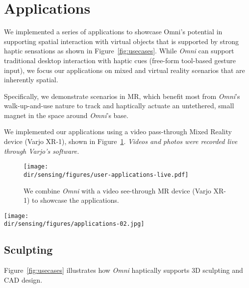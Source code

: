 \section{Applications}
We implemented a series of applications to showcase Omni's potential in supporting spatial interaction with virtual objects that is supported by strong haptic sensations as shown in Figure~\ref{fig:usecases}. While \textit{Omni} can support traditional desktop interaction with haptic cues (\eg free-form tool-based gesture input), we focus our applications on mixed and virtual reality scenarios that are inherently spatial.

Specifically, we demonstrate scenarios in MR, which benefit most from \textit{Omni}'s walk-up-and-use nature to track and haptically actuate an untethered, small magnet in the space around \textit{Omni}'s base.

We implemented our applications using a video pass-through Mixed Reality device (Varjo XR-1), shown in Figure~\ref{fig:photo_device_ar}.
\textit{Videos and photos were recorded live through Varjo's software.}
\begin{figure}[!t]
\centering
\texttt{[image: \\dir/sensing/figures/user-applications-live.pdf]}
\caption{We combine \textit{Omni} with a video see-through MR device (Varjo XR-1) to showcase the applications.}
\label{fig:photo_device_ar}
\end{figure}

\begin{figure*}[!t]
\centering
\texttt{[image: \\dir/sensing/figures/applications-02.jpg]}
\caption{We present possible use cases for \textit{Omni}. \textit{Left} shows the possibilities in 3D CAD design, in this case sculpting. \textit{Center} shows a user exploring and manipulating an augmented reality object. For both applications, users can feel the shape of the outer hull of the objects. \textit{Right} shows a racing game. Once the car collides with the wall, the pen gets pushed to the base. \textit{Arrows indicate movement and are drawn on top of the photo to increase clarity}. }
\label{fig:usecases}
\vspace{-1em}
\end{figure*}

\subsection{Sculpting}
Figure~\ref{fig:usecases} illustrates how \textit{Omni} haptically supports 3D sculpting and CAD design.

